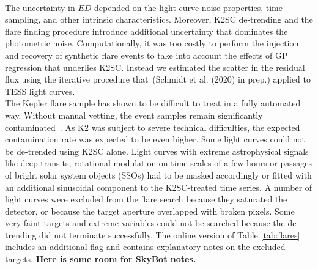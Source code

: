 \documentclass{aa}
\begin{document}
\\
The uncertainty in $ED$ depended on the light curve noise properties, time sampling, and other intrinsic characteristics. Moreover, K2SC de-trending and the flare finding procedure introduce additional uncertainty that dominates the photometric noise. Computationally, it was too costly to perform the injection and recovery of synthetic flare events to take into account the effects of GP regression that underlies K2SC. Instead we estimated the scatter in the residual flux using the iterative procedure that~(Schmidt et al. (2020) in prep.) applied to TESS light curves.
\\
The Kepler flare sample has shown to be difficult to treat in a fully automated way. Without manual vetting, the event samples remain significantly contaminated~\citep{yang_keplerflares_2019}. As K2 was subject to severe technical difficulties, the expected contamination rate was expected to be even higher. Some light curves could not be de-trended using K2SC alone. Light curves with extreme astrophysical signals like deep transits, rotational modulation on time scales of a few hours or passages of bright solar system objects (SSOs) had to be masked accordingly or fitted with an additional sinusoidal component to the K2SC-treated time series. A number of light curves were excluded from the flare search because they saturated the detector, or because the target aperture overlapped with broken pixels. Some very faint targets and extreme variables could not be searched because the de-trending did not terminate successfully. The online version of Table \ref{tab:flares} includes an additional flag and contains explanatory notes on the excluded targets. \textbf{Here is some room for SkyBot notes.}
\end{document}

